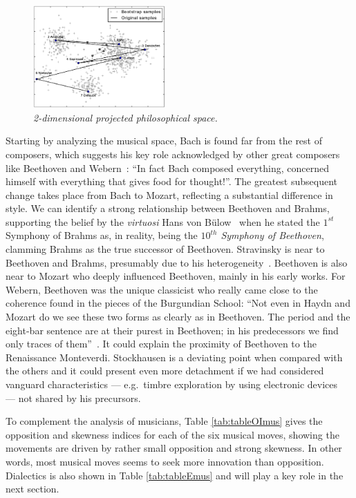 \documentclass[
 aip,
 jmp,
 amsmath,amssymb,
 reprint,
]{revtex4-1}
\begin{document}
\begin{figure}
        \begin{center}
                \includegraphics[width=0.45\textwidth]{pca_filosofos_novo}
        \end{center}
        \caption{\it 2-dimensional projected philosophical space.}
        \label{fig:pcaphi}
\end{figure}

Starting by analyzing the musical space, Bach is found far from the rest of
composers, which suggests his key role
acknowledged by other great composers like Beethoven and
Webern~\cite{Webern}: ``In fact Bach composed everything, concerned
himself with everything that gives food for thought!''. 
The greatest subsequent change takes place from Bach to Mozart,
reflecting a substantial difference in style.
We can identify a strong relationship between
Beethoven and Brahms, supporting the belief by the \textit{virtuosi} Hans von B\"{u}low~\cite{Bulow} when he
stated the $1^{st}$ Symphony of Brahms as, in reality, being the \textit{$10^{th}$ Symphony of
Beethoven}, clamming Brahms as the true successor of
Beethoven. Stravinsky is near to Beethoven and Brahms,
presumably due to his heterogeneity~\cite{BennettHistory,
  Lovelock}. Beethoven is also near to Mozart who deeply influenced
Beethoven, mainly in his early works.
For Webern, Beethoven was the unique classicist who really came close
to the coherence found in the pieces of the Burgundian School: ``Not even
in Haydn and Mozart do we see these two forms as clearly as in
Beethoven. The period and the eight-bar sentence are at their purest
in Beethoven; in his predecessors we find only traces of them''~\cite{Webern}. It
could explain the proximity of Beethoven to the Renaissance  Monteverdi.
Stockhausen is a deviating point when compared with the others and it
could present even more detachment if we had considered
vanguard characteristics --- e.g.\ timbre exploration by using
electronic devices~\cite{Lovelock} --- not
shared by his precursors.

To complement the analysis of musicians, Table \ref{tab:tableOImus} gives the
opposition and skewness indices for each of the six musical moves,
showing the movements are driven by rather small opposition and strong
skewness. In other words, most musical moves seems to seek more innovation
than opposition. Dialectics is also shown in Table
\ref{tab:tableEmus} and will play a key role in the next section.
\end{document}

